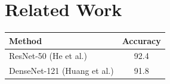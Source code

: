 \documentclass{article}
\begin{document}
\section{Related Work}
\begin{tabular}{lc}
Method & Accuracy \\
\hline
ResNet-50 (He et al.) & 92.4 \\
DenseNet-121 (Huang et al.) & 91.8 \\
\end{tabular}
\end{document}
